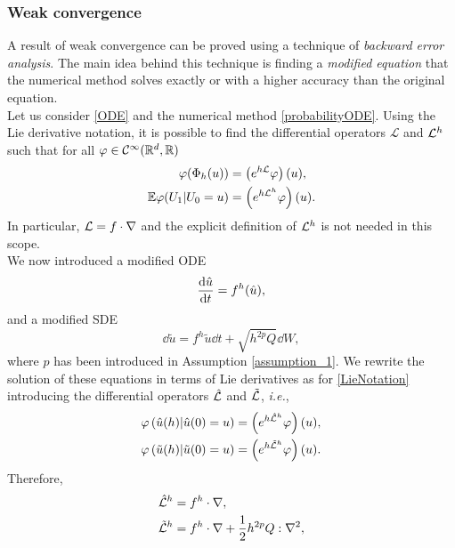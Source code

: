 \subsubsection{Weak convergence}

A result of weak convergence can be proved using a technique of \textit{backward error analysis}. The main idea behind this technique is finding a \textit{modified equation} that the numerical method solves exactly or with a higher accuracy than the original equation. \\
Let us consider \eqref{ODE} and the numerical method \eqref{probabilityODE}. Using the Lie derivative notation, it is possible to find the differential operators $\mathcal{L}$ and $\mathcal{L}^h$ such that for all $\varphi \in \mathcal{C}^\infty(\mathbb{R}^d, \mathbb{R})$ 
\begin{equation}\label{LieNotation}
\begin{aligned}
	\varphi(\Phi_h(u)) &= \left(e^{h\mathcal{L}} \varphi\right)(u), \\
	\mathbb{E}\varphi(U_1 | U_0 = u) &= \left(e^{h\mathcal{L}^h}\varphi\right)(u).
\end{aligned}
\end{equation}
In particular, $\mathcal{L} = f \cdot \nabla$ and the explicit definition of $\mathcal{L}^h$ is not needed in this scope. \\
We now introduced a modified ODE
\begin{equation}\label{modifiedODE}
	\dv{\hat u}{t} = f^h(\hat u), 
\end{equation}
and a modified SDE
\begin{equation}\label{modifiedSDE}
	\dd{\tilde u} = f^h{\tilde u}\dd{t} + \sqrt{h^{2p} Q} \dd{W},
\end{equation}
where $p$ has been introduced in Assumption \ref{assumption_1}. We rewrite the solution of these equations in terms of Lie derivatives as for \eqref{LieNotation} introducing the differential operators $\hat {\mathcal{L}}$ and $\tilde {\mathcal{L}}$, \textit{i.e.},
\begin{equation}\label{LieNotationModif}
\begin{aligned}
	\varphi\left(\hat u(h) | \hat u(0) = u\right) &= \left(e^{h\hat{\mathcal{L}}^h}\varphi\right)(u), \\
	\varphi\left(\tilde u(h)|\tilde u(0) = u\right) &= \left(e^{h\tilde{\mathcal{L}}^h}\varphi\right)(u).
\end{aligned}
\end{equation}
Therefore,
\begin{equation}
\begin{aligned}
	\hat {\mathcal{L}}^h &= f^h \cdot \nabla, \\
	\tilde {\mathcal{L}}^h &= f^h \cdot \nabla + \frac{1}{2} h^{2p} Q : \nabla^2,
\end{aligned}
\end{equation}

